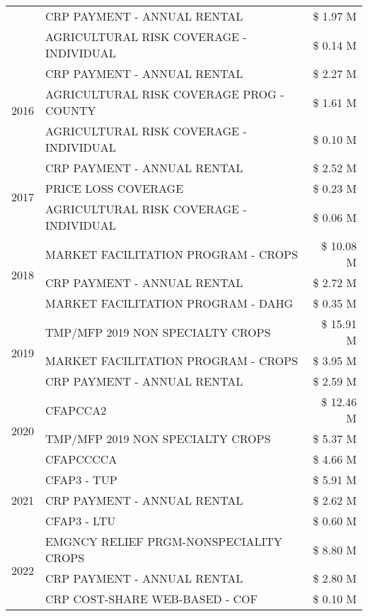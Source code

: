 \begin{tabular}{llr}
 & CRP PAYMENT - ANNUAL RENTAL & \$ 1.97 M \\
 & AGRICULTURAL RISK COVERAGE - INDIVIDUAL & \$ 0.14 M \\
\cline{1-3}
\multirow[t]{3}{*}{2016} & CRP PAYMENT - ANNUAL RENTAL & \$ 2.27 M \\
 & AGRICULTURAL RISK COVERAGE PROG - COUNTY & \$ 1.61 M \\
 & AGRICULTURAL RISK COVERAGE - INDIVIDUAL & \$ 0.10 M \\
\cline{1-3}
\multirow[t]{3}{*}{2017} & CRP PAYMENT - ANNUAL RENTAL & \$ 2.52 M \\
 & PRICE LOSS COVERAGE & \$ 0.23 M \\
 & AGRICULTURAL RISK COVERAGE - INDIVIDUAL & \$ 0.06 M \\
\cline{1-3}
\multirow[t]{3}{*}{2018} & MARKET FACILITATION PROGRAM - CROPS & \$ 10.08 M \\
 & CRP PAYMENT - ANNUAL RENTAL & \$ 2.72 M \\
 & MARKET FACILITATION PROGRAM - DAHG & \$ 0.35 M \\
\cline{1-3}
\multirow[t]{3}{*}{2019} & TMP/MFP 2019 NON SPECIALTY CROPS & \$ 15.91 M \\
 & MARKET FACILITATION PROGRAM - CROPS & \$ 3.95 M \\
 & CRP PAYMENT - ANNUAL RENTAL & \$ 2.59 M \\
\cline{1-3}
\multirow[t]{3}{*}{2020} & CFAPCCA2 & \$ 12.46 M \\
 & TMP/MFP 2019 NON SPECIALTY CROPS & \$ 5.37 M \\
 & CFAPCCCCA & \$ 4.66 M \\
\cline{1-3}
\multirow[t]{3}{*}{2021} & CFAP3 - TUP & \$ 5.91 M \\
 & CRP PAYMENT - ANNUAL RENTAL & \$ 2.62 M \\
 & CFAP3 - LTU & \$ 0.60 M \\
\cline{1-3}
\multirow[t]{3}{*}{2022} & EMGNCY RELIEF PRGM-NONSPECIALITY CROPS & \$ 8.80 M \\
 & CRP PAYMENT - ANNUAL RENTAL & \$ 2.80 M \\
 & CRP COST-SHARE WEB-BASED - COF & \$ 0.10 M \\
\cline{1-3}
\bottomrule
\end{tabular}
